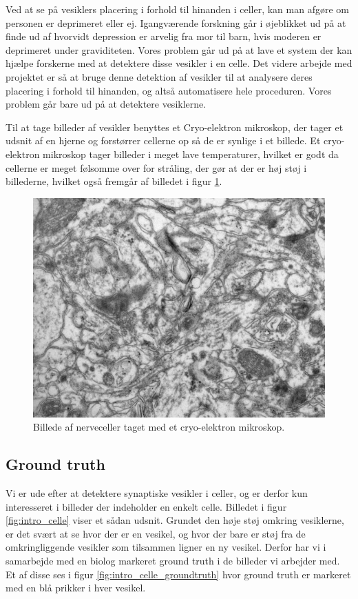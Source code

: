 Ved at se på vesiklers placering i forhold til hinanden i celler, kan man afgøre om personen er deprimeret eller ej. Igangværende forskning går i øjeblikket ud på at finde ud af hvorvidt depression er arvelig fra mor til barn, hvis moderen er deprimeret under graviditeten. Vores problem går ud på at lave et system der kan hjælpe forskerne med at detektere disse vesikler i en celle. Det videre arbejde med projektet er så at bruge denne detektion af vesikler til at analysere deres placering i forhold til hinanden, og altså automatisere hele proceduren. Vores problem går bare ud på at detektere vesiklerne.

Til at tage billeder af vesikler benyttes et Cryo-elektron mikroskop, der tager et udsnit af en hjerne og forstørrer cellerne op så de er synlige i et billede. Et cryo-elektron mikroskop tager billeder i meget lave temperaturer, hvilket er godt da cellerne er meget følsomme over for stråling, der gør at der er høj støj i billederne, hvilket også fremgår af billedet i figur \ref{fig:intro_celler}.

\begin{figure}[H]
	\centering
	\includegraphics[scale=0.5]{files/intro/img/celler.jpg}
	\caption{Billede af nerveceller taget med et cryo-elektron mikroskop.\label{fig:intro_celler}}
\end{figure}

\subsection{Ground truth}									%
Vi er ude efter at detektere synaptiske vesikler i celler, og er derfor kun interesseret i billeder der indeholder en enkelt celle. Billedet i figur \ref{fig:intro_celle} viser et sådan udsnit. Grundet den høje støj omkring vesiklerne, er det svært at se hvor der er en vesikel, og hvor der bare er støj fra de omkringliggende vesikler som tilsammen ligner en ny vesikel. Derfor har vi i samarbejde med en biolog markeret ground truth i de billeder vi arbejder med. Et af disse ses i figur \ref{fig:intro_celle_groundtruth} hvor ground truth er markeret med en blå prikker i hver vesikel.

